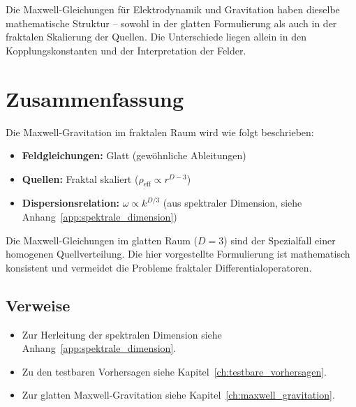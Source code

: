 Die Maxwell-Gleichungen für Elektrodynamik und Gravitation haben dieselbe mathematische Struktur – sowohl in der glatten Formulierung als auch in der fraktalen Skalierung der Quellen. Die Unterschiede liegen allein in den Kopplungskonstanten und der Interpretation der Felder.

\section{Zusammenfassung}
\label{sec:fm_zusammenfassung}

Die Maxwell-Gravitation im fraktalen Raum wird wie folgt beschrieben:

\begin{itemize}
    \item \textbf{Feldgleichungen:} Glatt (gewöhnliche Ableitungen)
    \item \textbf{Quellen:} Fraktal skaliert (\( \rho_{\text{eff}} \propto r^{D-3} \))
    \item \textbf{Dispersionsrelation:} \( \omega \propto k^{D/3} \) (aus spektraler Dimension, siehe Anhang~\ref{app:spektrale_dimension})
\end{itemize}

Die Maxwell-Gleichungen im glatten Raum (\( D = 3 \)) sind der Spezialfall einer homogenen Quellverteilung. Die hier vorgestellte Formulierung ist mathematisch konsistent und vermeidet die Probleme fraktaler Differentialoperatoren.

\subsection*{Verweise}

\begin{itemize}
    \item Zur Herleitung der spektralen Dimension siehe Anhang~\ref{app:spektrale_dimension}.
    \item Zu den testbaren Vorhersagen siehe Kapitel~\ref{ch:testbare_vorhersagen}.
    \item Zur glatten Maxwell-Gravitation siehe Kapitel~\ref{ch:maxwell_gravitation}.
\end{itemize}